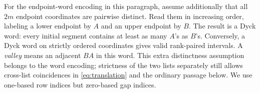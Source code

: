 For the endpoint-word encoding in this paragraph, assume additionally that all $2m$ endpoint coordinates are pairwise distinct. Read them in increasing order, labeling a lower endpoint by $A$ and an upper endpoint by $B$. The result is a Dyck word: every initial segment contains at least as many $A$'s as $B$'s. Conversely, a Dyck word on strictly ordered coordinates gives valid rank-paired intervals. A \emph{valley} means an adjacent $BA$ in this word. This extra distinctness assumption belongs to the word encoding; strictness of the two lists separately still allows cross-list coincidences in \eqref{eq:translation} and the ordinary passage below. We use one-based row indices but zero-based gap indices.
